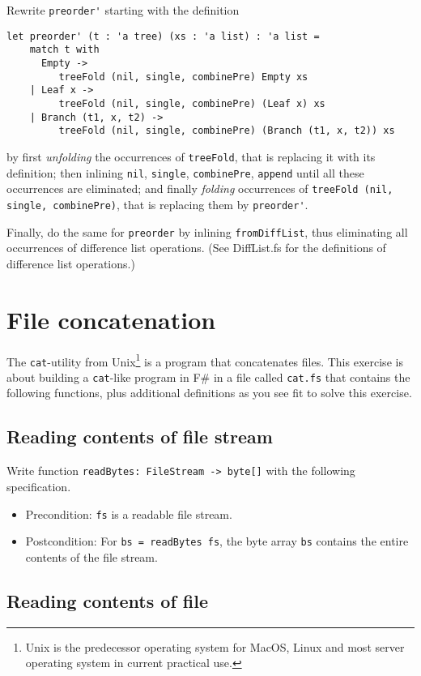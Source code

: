 \documentclass[a4paper,11pt]{article}
\begin{document}
\newpage Rewrite \verb|preorder'| starting with the definition
\begin{verbatim}
let preorder' (t : 'a tree) (xs : 'a list) : 'a list =
    match t with
      Empty -> 
         treeFold (nil, single, combinePre) Empty xs
    | Leaf x -> 
         treeFold (nil, single, combinePre) (Leaf x) xs 
    | Branch (t1, x, t2) -> 
         treeFold (nil, single, combinePre) (Branch (t1, x, t2)) xs 
\end{verbatim}
by first \emph{unfolding} the occurrences of \verb|treeFold|, that is replacing it with its definition; then inlining \verb|nil|, \verb|single|, \verb|combinePre|, \verb|append| until all these occurrences are eliminated; and finally \emph{folding} occurrences of \verb|treeFold (nil, single, combinePre)|, that is replacing them by \verb|preorder'|. 

Finally, do the same for \verb|preorder| by inlining \verb|fromDiffList|, thus eliminating all occurrences of difference list operations.
(See DiffList.fs for the definitions of difference list operations.) 

\section{File concatenation}

The \texttt{cat}-utility from 
Unix\footnote{Unix is the predecessor operating system for MacOS, Linux and most server operating system in current practical use.} 
is a program that concatenates files.  
This exercise is about building a \texttt{cat}-like program in F\# in a file called \texttt{cat.fs} that contains the following functions, plus additional definitions as you see fit to solve this exercise.

\subsection{Reading contents of file stream}

Write function \texttt{readBytes: FileStream -> byte[]} with the following specification.  
\begin{itemize}
\item Precondition: \texttt{fs} is a readable file stream.
\item Postcondition: For \texttt{bs = readBytes fs}, the byte array \texttt{bs} contains the entire contents of the file stream.   
\end{itemize}

\subsection{Reading contents of file}
\end{document}
